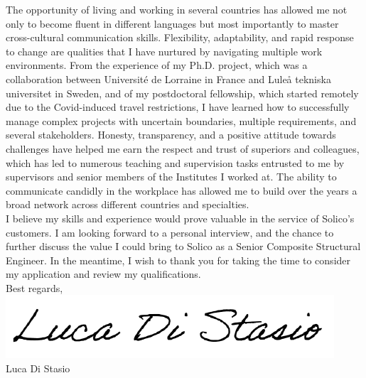 \documentclass[
  a4paper, 
]{fortysecondscv}
\begin{document}
The opportunity of living and working in several countries has allowed me not only to become fluent in different languages but most importantly to master cross-cultural communication skills. Flexibility, adaptability, and rapid response to change are qualities that I have nurtured by navigating multiple work environments. From the experience of my Ph.D. project, which was a collaboration between Université de Lorraine in France and Luleå tekniska universitet in Sweden, and of my postdoctoral fellowship, which started remotely due to the Covid-induced travel restrictions, I have learned how to successfully manage complex projects with uncertain boundaries, multiple requirements, and several stakeholders. Honesty, transparency, and a positive attitude towards challenges have helped me earn the respect and trust of superiors and colleagues, which has led to numerous teaching and supervision tasks entrusted to me by supervisors and senior members of the Institutes I worked at. The ability to communicate candidly in the workplace has allowed me to build over the years a broad network across different countries and specialties.\\[8pt]
I believe my skills and experience would prove valuable in the service of Solico's customers. I am looking forward to a personal interview, and the chance to further discuss the value I could bring to Solico as a Senior Composite Structural Engineer. In the meantime, I wish to thank you for taking the time to consider my application and review my qualifications.\\[12pt]
Best regards,\\
\includegraphics[scale=0.75]{Signature.png}\\
Luca Di Stasio
\end{document}
